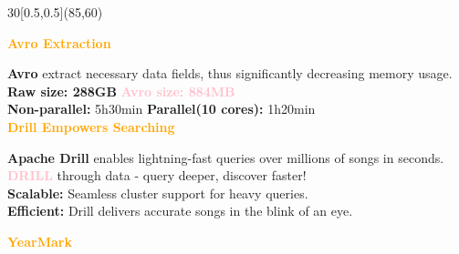 \documentclass{beamer}
\begin{document}
\begin{textblock}{30}[0.5,0.5](85,60)
  \begin{basebox}[frame hidden, interior hidden, halign=center, valign=center]
    \raggedleft
    \color{white}
    \vspace{1.5cm}

    \begin{minipage}{0.85\linewidth}
      \raggedleft
      {\textcolor{orange}{\Huge \textbf{Avro Extraction}}}\\[0.5cm]

      \vspace{0.5cm}

      {\large \textbf{Avro} extract necessary data fields, thus significantly decreasing memory usage.}\\[0.6em]
      {\Large \textbf{Raw size: 288GB} \LARGE\textcolor{pink}{\textbf{Avro size: 884MB}}}\\[0.4em]
      {\Large \textbf{Non-parallel:} 5h30min \textbf{Parallel(10 cores):} 1h20min}\\[0.4em]
      
      {\textcolor{orange}{\Huge \textbf{Drill Empowers Searching}}}\\[0.5cm]

      \vspace{0.5cm}

      {\large \textbf{Apache Drill} enables lightning-fast queries over millions of songs in seconds.}\\[0.6em]
      {\textcolor{pink}{\Large \textbf{DRILL}} \large through data - query deeper, discover faster!}\\[0.4em]
      {\normalsize
          \textbf{Scalable:} Seamless cluster support for heavy queries.\\
          \textbf{Efficient:} Drill delivers accurate songs in the blink of an eye.
      }

      \vspace{1cm}

      {\textcolor{orange}{\Huge \textbf{YearMark}}}\\[-0.1cm]


\end{minipage}
\end{basebox}
\end{textblock}
\end{document}
